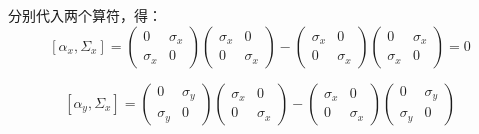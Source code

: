 分别代入两个算符，得：
\begin{equation}
\left[\alpha_{x}, \Sigma_{x}\right] = \left(\begin{array}{cc}
0 & \sigma_{x} \\
\sigma_{x} & 0
\end{array}\right)\left(\begin{array}{cc}
\sigma_{x} & 0 \\
0 & \sigma_{x}
\end{array}\right)-\left(\begin{array}{cc}
\sigma_{x} & 0 \\
0 & \sigma_{x}
\end{array}\right)\left(\begin{array}{cc}
0 & \sigma_{x} \\
\sigma_{x} & 0
\end{array}\right) = 0
\end{equation}

\begin{equation}
\left[\alpha_{y}, \Sigma_{x}\right] = \left(\begin{array}{cc}
0 & \sigma_{y} \\
\sigma_{y} & 0
\end{array}\right)\left(\begin{array}{cc}
\sigma_{x} & 0 \\
0 & \sigma_{x}
\end{array}\right)-\left(\begin{array}{cc}
\sigma_{x} & 0 \\
0 & \sigma_{x}
\end{array}\right)\left(\begin{array}{cc}
0 & \sigma_{y} \\
\sigma_{y} & 0
\end{array}\right)
\end{equation}


